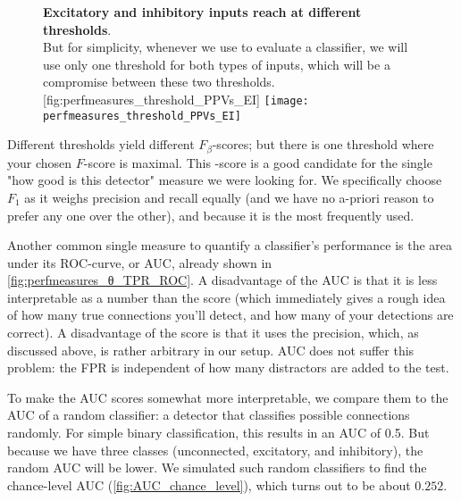 \begin{figure}
    \begin{sidecaption}
        {\textbf{Excitatory and inhibitory inputs reach \maxF at different thresholds}.\\
        But for simplicity, whenever we use \maxF to evaluate a classifier, we will use only one threshold for both types of inputs, which will be a compromise between these two thresholds.}
        [fig:perfmeasures_threshold_PPVs_EI]
        \texttt{[image: perfmeasures\_threshold\_PPVs\_EI]}
    \end{sidecaption}
\end{figure}

Different thresholds yield different $F_β$-scores; but there is one threshold where your chosen $F$-score is maximal. This \maxF-score is a good candidate for the single "how good is this detector" measure we were looking for. We specifically choose $F_1$ as it weighs precision and recall equally (and we have no a-priori reason to prefer any one over the other), and because it is the most frequently used.

Another common single measure to quantify a classifier's performance is the area under its ROC-curve, or AUC, already shown in \cref{fig:perfmeasures_θ_TPR_ROC}. A disadvantage of the AUC is that it is less interpretable as a number than the \maxF score (which immediately gives a rough idea of how many true connections you'll detect, and how many of your detections are correct).
A disadvantage of the \maxF score is that it uses the precision, which, as discussed above, is rather arbitrary in our setup. AUC does not suffer this problem: the FPR is independent of how many distractors are added to the test.

To make the AUC scores somewhat more interpretable, we compare them to the AUC of a random classifier: a detector that classifies possible connections randomly. For simple binary classification, this results in an AUC of 0.5. But because we have three classes (unconnected, excitatory, and inhibitory), the random AUC will be lower. We simulated such random classifiers to find the chance-level AUC (\cref{fig:AUC_chance_level}), which turns out to be about $0.252$.

